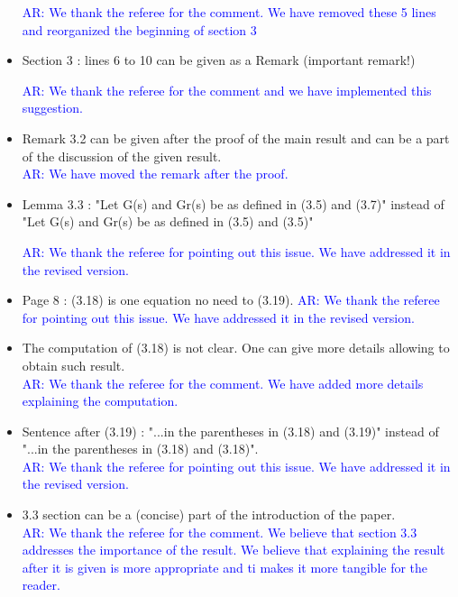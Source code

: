 \documentclass[11pt]{article}
\def\serkan#1{\textcolor{blue}{{#1}}}
\begin{document}
\begin{itemize}
\serkan{\textsf{AR}:  We thank the referee for the comment. We have removed these 5 lines and reorganized the beginning of section 3 }


\item Section 3 : lines 6 to 10 can be given as a Remark (important remark!) 

\serkan{\textsf{AR}:  We thank the referee for the comment and we have implemented this suggestion. }

\item Remark 3.2 can be given after the proof of the main result and can be
a part of the discussion of the given result. \\
\serkan{\textsf{AR}:  We have moved the remark after the proof. }

\item Lemma 3.3 : "Let G(s) and Gr(s) be as defined in (3.5) and (3.7)"
instead of "Let G(s) and Gr(s) be as defined in (3.5) and (3.5)"

\serkan{\textsf{AR}:  We thank the referee for pointing out this issue. We have addressed it in the revised version.}

\item Page 8 : (3.18) is one equation no need to (3.19).
\serkan{\textsf{AR}:  We thank the referee for pointing out this issue. We have addressed it in the revised version.}

\item The computation of (3.18) is not clear. One can give more details
allowing to obtain such result. \\
\serkan{\textsf{AR}:  We thank the referee for the comment. We have added more details explaining the computation.}

\item Sentence after (3.19) : "...in the parentheses in (3.18) and (3.19)"
instead of "...in the parentheses in (3.18) and (3.18)". \\

\serkan{\textsf{AR}:  We thank the referee for pointing out this issue. We have addressed it in the revised version.}

\item 3.3 section can be a (concise) part of the introduction of the paper. \\
\serkan{\textsf{AR}:  We thank the referee for the comment.  We believe that section 3.3 addresses the importance of the result. We believe that explaining the result after it is given is more appropriate and ti makes it more tangible for the reader.}


\end{itemize}
\end{document}

